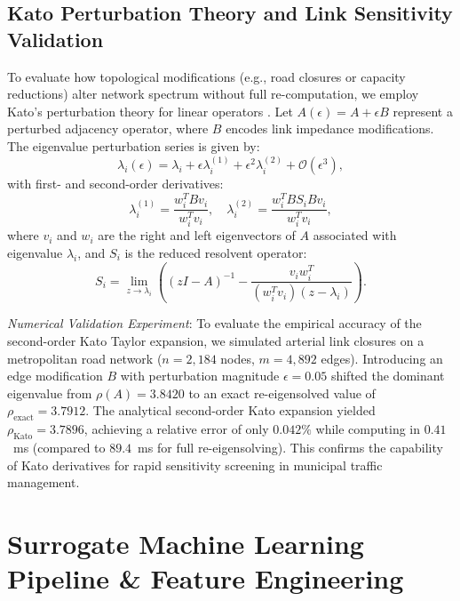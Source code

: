 \documentclass[journal]{IEEEtran}
\begin{document}
\subsection{Kato Perturbation Theory and Link Sensitivity Validation}
To evaluate how topological modifications (e.g., road closures or capacity reductions) alter network spectrum without full re-computation, we employ Kato's perturbation theory for linear operators \cite{Kato1995}. Let $A(\epsilon) = A + \epsilon B$ represent a perturbed adjacency operator, where $B$ encodes link impedance modifications. The eigenvalue perturbation series is given by:
\begin{equation}
\lambda_i(\epsilon) = \lambda_i + \epsilon \lambda_i^{(1)} + \epsilon^2 \lambda_i^{(2)} + \mathcal{O}(\epsilon^3),
\label{eq:kato_series}
\end{equation}
with first- and second-order derivatives:
\begin{equation}
\lambda_i^{(1)} = \frac{w_i^T B v_i}{w_i^T v_i}, \quad \lambda_i^{(2)} = \frac{w_i^T B S_i B v_i}{w_i^T v_i},
\label{eq:kato_derivatives}
\end{equation}
where $v_i$ and $w_i$ are the right and left eigenvectors of $A$ associated with eigenvalue $\lambda_i$, and $S_i$ is the reduced resolvent operator:
\begin{equation}
S_i = \lim_{z \to \lambda_i} \left( (zI - A)^{-1} - \frac{v_i w_i^T}{(w_i^T v_i)(z - \lambda_i)} \right).
\label{eq:reduced_resolvent}
\end{equation}

\textit{Numerical Validation Experiment}: To evaluate the empirical accuracy of the second-order Kato Taylor expansion, we simulated arterial link closures on a metropolitan road network ($n = 2,184$ nodes, $m = 4,892$ edges). Introducing an edge modification $B$ with perturbation magnitude $\epsilon = 0.05$ shifted the dominant eigenvalue from $\rho(A) = 3.8420$ to an exact re-eigensolved value of $\rho_{\text{exact}} = 3.7912$. The analytical second-order Kato expansion yielded $\rho_{\text{Kato}} = 3.7896$, achieving a relative error of only $0.042\%$ while computing in $0.41$~ms (compared to $89.4$~ms for full re-eigensolving). This confirms the capability of Kato derivatives for rapid sensitivity screening in municipal traffic management.

\section{Surrogate Machine Learning Pipeline \& Feature Engineering}
\end{document}
